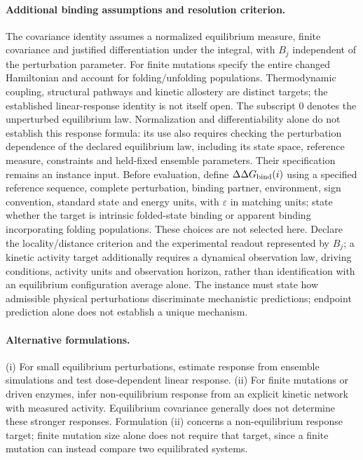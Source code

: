 \documentclass[11pt]{article}
\begin{document}
\paragraph{Additional binding assumptions and resolution criterion.} The covariance identity assumes a normalized equilibrium measure, finite covariance and justified differentiation under the integral, with $B_j$ independent of the perturbation parameter. For finite mutations specify the entire changed Hamiltonian and account for folding/unfolding populations. Thermodynamic coupling, structural pathways and kinetic allostery are distinct targets; the established linear-response identity is not itself open. The subscript $0$ denotes the unperturbed equilibrium law. Normalization and differentiability alone do not establish this response formula: its use also requires checking the perturbation dependence of the declared equilibrium law, including its state space, reference measure, constraints and held-fixed ensemble parameters. Their specification remains an instance input. Before evaluation, define $\Delta\Delta G_{\rm bind}(i)$ using a specified reference sequence, complete perturbation, binding partner, environment, sign convention, standard state and energy units, with $\varepsilon$ in matching units; state whether the target is intrinsic folded-state binding or apparent binding incorporating folding populations. These choices are not selected here. Declare the locality/distance criterion and the experimental readout represented by $B_j$; a kinetic activity target additionally requires a dynamical observation law, driving conditions, activity units and observation horizon, rather than identification with an equilibrium configuration average alone. The instance must state how admissible physical perturbations discriminate mechanistic predictions; endpoint prediction alone does not establish a unique mechanism.

\paragraph{Alternative formulations.} (i) For small equilibrium perturbations, estimate response from ensemble simulations and test dose-dependent linear response. (ii) For finite mutations or driven enzymes, infer non-equilibrium response from an explicit kinetic network with measured activity. Equilibrium covariance generally does not determine these stronger responses. Formulation (ii) concerns a non-equilibrium response target; finite mutation size alone does not require that target, since a finite mutation can instead compare two equilibrated systems.
\end{document}
